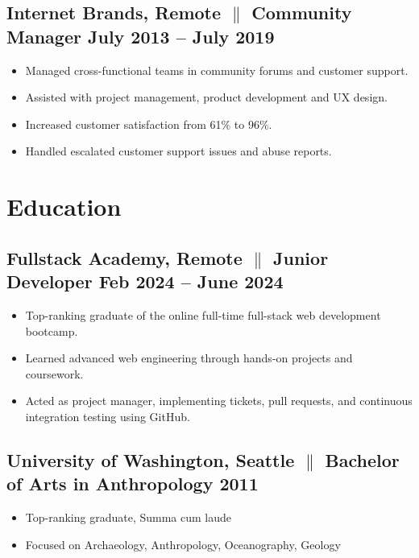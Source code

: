 \documentclass[a4paper,10pt]{article}
\begin{document}
\subsection{Internet Brands, Remote {$\parallel$}{ Community Manager} \hfill
      \textbf{July 2013 – July
            2019}}
\begin{itemize}
      \item Managed cross-functional teams in community forums and customer
            support.
      \item Assisted with project management, product development and UX
            design.
      \item Increased customer satisfaction from 61\%
            to
            96\%.
      \item Handled escalated customer support issues and abuse reports.
\end{itemize}

\section{Education}
\subsection{Fullstack Academy, Remote {$\parallel$} {Junior Developer} \hfill
      \textbf{Feb
            2024 – June
            2024}}
\begin{itemize}
      \item Top-ranking graduate of the online full-time full-stack web
            development
            bootcamp.
      \item Learned advanced web engineering through
            hands-on
            projects and coursework.
      \item Acted as project manager, implementing tickets, pull requests, and
            continuous integration testing using GitHub.
\end{itemize}

\subsection{University of Washington, Seattle {$\parallel$}{ Bachelor of Arts
                  in Anthropology} \hfill
      \textbf{2011}}
\begin{itemize}
      \item Top-ranking graduate, Summa cum laude
      \item Focused on Archaeology, Anthropology, Oceanography, Geology
\end{itemize}
\end{document}
